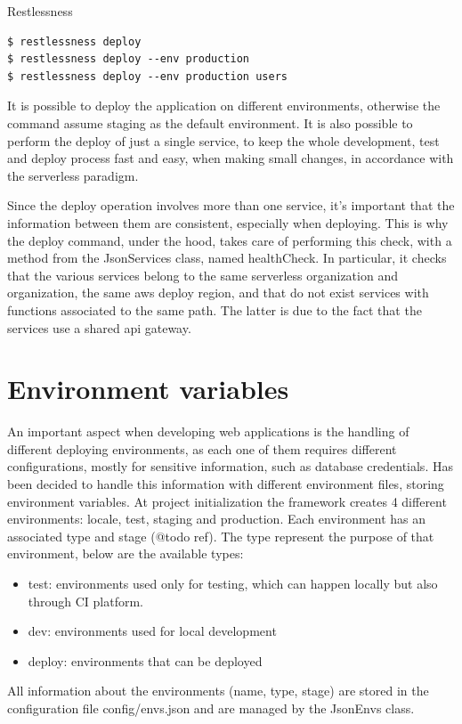 \begin{chapter}{Restlessness}
    \begin{lstlisting}[caption=Deploy command, label={lst:rln_command_deploy}]
$ restlessness deploy
$ restlessness deploy --env production
$ restlessness deploy --env production users
    \end{lstlisting}

    It is possible to deploy the application on different environments, otherwise
    the command assume staging as the default environment.
    It is also possible to perform the deploy of just a single service, to keep
    the whole development, test and deploy process fast and easy, when making small
    changes, in accordance with the serverless paradigm.

    Since the deploy operation involves more than one service, it's important that
    the information between them are consistent, especially when deploying. This is
    why the deploy command, under the hood, takes care of performing this check,
    with a method from the JsonServices class, named healthCheck.
    In particular, it checks that the various services belong to the same serverless
    organization and organization, the same aws deploy region, and that do not exist
    services with functions associated to the same path. The latter is due to the fact
    that the services use a shared api gateway.

    \section{Environment variables}
    \label{sec:env_vars}
    An important aspect when developing web applications is the handling of different
    deploying environments, as each one of them requires different configurations,
    mostly for sensitive information, such as database credentials.
    Has been decided to handle this information with different environment files,
    storing environment variables.
    At project initialization the framework creates 4 different environments: locale,
    test, staging and production. Each environment has an associated type and
    stage (@todo ref). The type represent the purpose of that environment, below
    are the available types:
    \begin{itemize}
        \item test: environments used only for testing, which can happen locally
            but also through CI platform.
        \item dev: environments used for local development
        \item deploy: environments that can be deployed
    \end{itemize}
    All information about the environments (name, type, stage) are stored in the
    configuration file config/envs.json and are managed by the JsonEnvs class.


\end{chapter}
